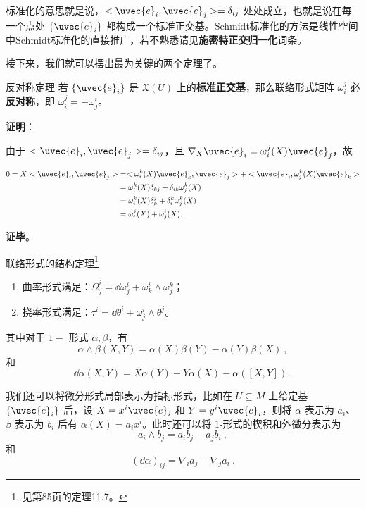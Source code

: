 标准化的意思就是说，$<\uvec{e}_i, \uvec{e}_j>=\delta_{ij}$ 处处成立，也就是说在每一个点处 $\{\uvec{e}_i\}$ 都构成一个标准正交基。Schmidt标准化的方法是线性空间中Schmidt标准化的直接推广，若不熟悉请见\textbf{施密特正交归一化}词条。

接下来，我们就可以摆出最为关键的两个定理了。

\begin{theorem}{反对称定理}\label{the_ConFom_1}
若 $\{\uvec{e}_i\}$ 是 $\mathfrak{X}(U)$ 上的\textbf{标准正交基}，那么联络形式矩阵 $\omega^j_i$ 必\textbf{反对称}，即 $\omega^j_i=-\omega^i_j$。
\end{theorem}

\textbf{证明}：

由于 $<\uvec{e}_i, \uvec{e}_j>=\delta_{ij}$，且 $\nabla_X\uvec{e}_i=\omega^j_i(X)\uvec{e}_j$，故

\begin{equation}
\begin{aligned}
0=X<\uvec{e}_i, \uvec{e}_j>&=<\omega^k_i(X)\uvec{e}_k, \uvec{e}_j>+<\uvec{e}_i, \omega^k_j(X)\uvec{e}_k>\\
&=\omega^k_i(X)\delta_{kj}+\delta_{ik}\omega^k_j(X)\\
&=\omega^k_i(X)\delta_{k}^j+\delta_{i}^k\omega^k_j(X)\\
&=\omega^j_i(X)+\omega^i_j(X)~.
\end{aligned}
\end{equation}

\textbf{证毕}。



\begin{theorem}{联络形式的结构定理\footnote{见\cite{GTM275}第85页的定理11.7。}}\label{the_ConFom_2}
\begin{enumerate}
\item 曲率形式满足：$\Omega^i_j=\dd \omega^i_j+\omega^i_k\wedge\omega^k_j$；
\item 挠率形式满足：$\tau^i=\dd\theta^i+\omega^i_j\wedge\theta^j$。
\end{enumerate}

其中对于 $1-$ 形式 $\alpha, \beta$，有
\begin{equation}
\alpha\wedge \beta(X, Y)=\alpha(X)\beta(Y)-\alpha(Y)\beta(X)~,
\end{equation}
和
\begin{equation}
\dd \alpha(X, Y)=X\alpha(Y)-Y\alpha(X)-\alpha([X, Y])~.
\end{equation}

我们还可以将微分形式局部表示为指标形式，比如在 $U\subseteq M$ 上给定基 $\{\uvec{e}_i\}$ 后，设 $X=x^i\uvec{e}_i$ 和 $Y=y^i\uvec{e}_i$，则将 $\alpha$ 表示为 $a_i$、$\beta$ 表示为 $b_i$ 后有 $\alpha(X)=a_ix^i$。此时还可以将 $1$-形式的楔积和外微分表示为
\begin{equation}
a_i\wedge b_j=a_ib_j-a_jb_i~,
\end{equation}
和
\begin{equation}
(\dd \alpha)_{ij}=\nabla_{i}a_j-\nabla_{j}a_i~.
\end{equation}
\end{theorem}












